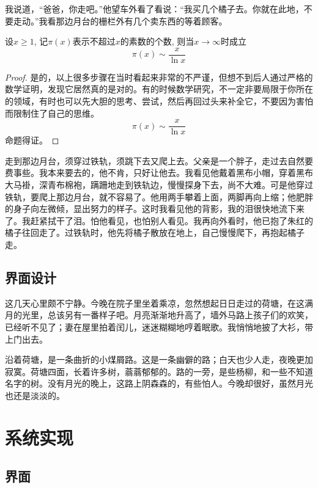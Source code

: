 \documentclass[printMode]{ecnuthesis}
\begin{document}
我说道，“爸爸，你走吧。”他望车外看了看说：“我买几个橘子去。你就在此地，不要走动。”我看那边月台的栅栏外有几个卖东西的等着顾客。

\begin{theorem}[素数定理]
  设$x \geqslant 1$, 记$\pi(x)$表示不超过$x$的素数的个数, 则当$x \to \infty$时成立
  \[\pi(x) \sim \frac{x}{\ln x}\]
\end{theorem}

\begin{proof}
  是的，以上很多步骤在当时看起来非常的不严谨，但想不到后人通过严格的数学证明，发现它居然真的是对的。有的时候数学研究，不一定非要局限于你所在的领域，有时也可以先大胆的思考、尝试，然后再回过头来补全它，不要因为害怕而限制住了自己的思维。
  \[\pi(x) \sim \frac{x}{\ln x}\]
  命题得证。
\end{proof}

走到那边月台，须穿过铁轨，须跳下去又爬上去。父亲是一个胖子，走过去自然要费事些。我本来要去的，他不肯，只好让他去。我看见他戴着黑布小帽，穿着黑布大马褂，深青布棉袍，蹒跚地走到铁轨边，慢慢探身下去，尚不大难。可是他穿过铁轨，要爬上那边月台，就不容易了。他用两手攀着上面，两脚再向上缩；他肥胖的身子向左微倾，显出努力的样子。这时我看见他的背影，我的泪很快地流下来了。我赶紧拭干了泪。怕他看见，也怕别人看见。我再向外看时，他已抱了朱红的橘子往回走了。过铁轨时，他先将橘子散放在地上，自己慢慢爬下，再抱起橘子走。

\section{界面设计}

这几天心里颇不宁静。今晚在院子里坐着乘凉，忽然想起日日走过的荷塘，在这满月的光里，总该另有一番样子吧。月亮渐渐地升高了，墙外马路上孩子们的欢笑，已经听不见了；妻在屋里拍着闰儿，迷迷糊糊地哼着眠歌。我悄悄地披了大衫，带上门出去。

沿着荷塘，是一条曲折的小煤屑路。这是一条幽僻的路；白天也少人走，夜晚更加寂寞。荷塘四面，长着许多树，蓊蓊郁郁的。路的一旁，是些杨柳，和一些不知道名字的树。没有月光的晚上，这路上阴森森的，有些怕人。今晚却很好，虽然月光也还是淡淡的。

\chapter{系统实现}

\section{界面}
\end{document}
